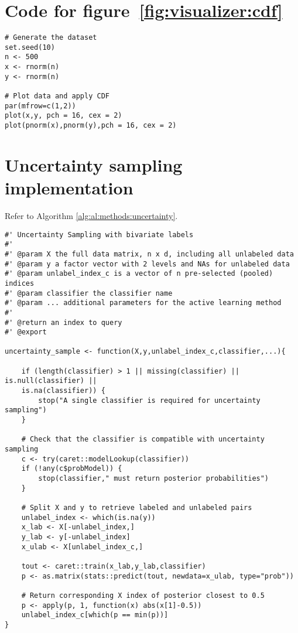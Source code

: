 \section{Code for figure~\ref{fig:visualizer:cdf}}
\label{sec:appendicies:cdf}
{
\begin{lstlisting}
# Generate the dataset
set.seed(10)
n <- 500
x <- rnorm(n)
y <- rnorm(n)

# Plot data and apply CDF
par(mfrow=c(1,2))
plot(x,y, pch = 16, cex = 2)
plot(pnorm(x),pnorm(y),pch = 16, cex = 2)
\end{lstlisting}
}




\section{Uncertainty sampling implementation}
\label{sec:appendicies:al:uncertainty}

Refer to Algorithm \ref{alg:al:methods:uncertainty}. 
{
\begin{lstlisting}
#' Uncertainty Sampling with bivariate labels
#'
#' @param X the full data matrix, n x d, including all unlabeled data
#' @param y a factor vector with 2 levels and NAs for unlabeled data
#' @param unlabel_index_c is a vector of n pre-selected (pooled) indices
#' @param classifier the classifier name
#' @param ... additional parameters for the active learning method
#'
#' @return an index to query
#' @export

uncertainty_sample <- function(X,y,unlabel_index_c,classifier,...){

	if (length(classifier) > 1 || missing(classifier) || is.null(classifier) || 
	is.na(classifier)) {
		stop("A single classifier is required for uncertainty sampling")
	}
	
	# Check that the classifier is compatible with uncertainty sampling
	c <- try(caret::modelLookup(classifier))
	if (!any(c$probModel)) {
		stop(classifier," must return posterior probabilities")
	}
	
	# Split X and y to retrieve labeled and unlabeled pairs
	unlabel_index <- which(is.na(y))
	x_lab <- X[-unlabel_index,]
	y_lab <- y[-unlabel_index]
	x_ulab <- X[unlabel_index_c,]
	
	tout <- caret::train(x_lab,y_lab,classifier)
	p <- as.matrix(stats::predict(tout, newdata=x_ulab, type="prob"))
	
	# Return corresponding X index of posterior closest to 0.5
	p <- apply(p, 1, function(x) abs(x[1]-0.5))
	unlabel_index_c[which(p == min(p))]
}
\end{lstlisting}
}

